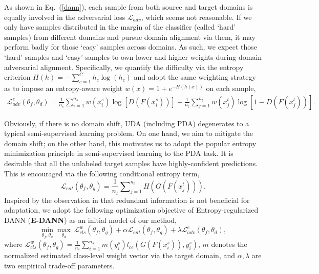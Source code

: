 \documentclass[runningheads]{llncs}
\begin{document}
	
As shown in Eq.~(\ref{dann}), each sample from both source and target domains is equally involved in the adversarial loss $\mathcal{L}_{adv}$, which seems not reasonable.
If we only have samples distributed in the margin of the classifier (called `hard' samples) from different domains and pursue domain alignment via them, it may perform badly for those `easy' samples across domains.
As such, we expect those `hard' samples and `easy' samples to own lower and higher weights during domain adversarial alignment.
Specifically, we quantify the difficulty via the entropy criterion $H(h) = -\sum_{c=1}^{C}h_c\log(h_c)$ and adopt the same weighting strategy as \cite{long2018conditional} to impose an entropy-aware weight $w(x) = 1 + e^{-H(h(x))}$ on each sample,
\begin{equation}
\begin{aligned}
\mathcal{L}_{adv}^{e}(\theta_f, \theta_d) = \frac{1}{n_s}\sum\nolimits_{i=1}^{n_s} w(x_i^s)\log[D(F(x_i^s))] + \frac{1}{n_t}\sum\nolimits_{j=1}^{n_t} w(x_j^t)\log[1 - D(F(x_j^t))].
\end{aligned}
\end{equation}


Obviously, if there is no domain shift, UDA (including PDA) degenerates to a typical semi-supervised learning problem.
On one hand, we aim to mitigate the domain shift; on the other hand, this motivates us to adopt the popular entropy minimization principle \cite{grandvalet2005semi} in semi-supervised learning to the PDA task.
It is desirable that all the unlabeled target samples have highly-confident predictions. This is encouraged via the following conditional entropy term,
\begin{equation}
\mathcal{L}_{ent}(\theta_f,\theta_y) =     \frac{1}{n_t}\sum\nolimits_{j=1}^{n_t} H(G(F(x_j^t))).
\label{tar_ent}
\end{equation}
Inspired by the observation in \cite{cao2018partialb} that redundant information is not beneficial for adaptation, we adopt the following optimization objective of Entropy-regularized DANN (\textbf{E-DANN}) as an initial model of our method,
\begin{equation}
\min\limits_{\theta_f, \theta_g} \max\limits_{\theta_d} \ \mathcal{L}_{cls}^{w}(\theta_f,\theta_g) + \alpha \mathcal{L}_{ent}(\theta_f,\theta_g) + \lambda \mathcal{L}_{adv}^{e}(\theta_f,\theta_d),
\label{edann}
\end{equation}
where $\mathcal{L}_{cls}^{w}(\theta_f, \theta_g)=\frac{1}{n_s} \sum\nolimits_{i=1}^{n_s} m(y_i^s) {l}_{ce}(G(F(x_i^s)), y_i^s)$, $m$ denotes the normalized estimated class-level weight vector via the target domain, and $\alpha,\lambda$ are two empirical trade-off parameters.
	
\end{document}

